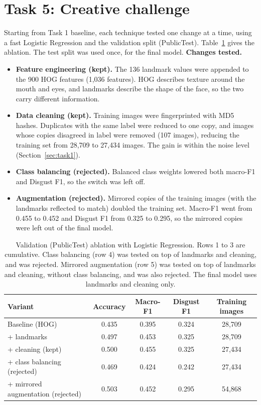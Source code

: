 \section{Task 5: Creative challenge}
\label{sec:creative}

Starting from Task 1 baseline, each technique tested one change at a time, using a fast Logistic Regression and the validation split (PublicTest). Table~\ref{tab:creative} gives the ablation. The test split was used once, for the final model.
\textbf{Changes tested.}
\begin{itemize}
\item \textbf{Feature engineering (kept).} The 136 landmark values were appended to the 900 HOG features (1,036 features). HOG describes texture around the mouth and eyes, and landmarks describe the shape of the face, so the two carry different information.
\item \textbf{Data cleaning (kept).} Training images were fingerprinted with MD5 hashes. Duplicates with the same label were reduced to one copy, and images whose copies disagreed in label were removed (107 images), reducing the training set from 28,709 to 27,434 images. The gain is within the noise level (Section~\ref{sec:task1}).
\item \textbf{Class balancing (rejected).} Balanced class weights lowered both macro-F1 and Disgust F1, so the switch was left off.
\item \textbf{Augmentation (rejected).} Mirrored copies of the training images (with the landmarks reflected to match) doubled the training set. Macro-F1 went from 0.455 to 0.452 and Disgust F1 from 0.325 to 0.295, so the mirrored copies were left out of the final model.
\end{itemize}

\begin{table}[h]
\centering\small
\caption{Validation (PublicTest) ablation with Logistic Regression. Rows 1 to 3 are cumulative. Class balancing (row 4) was tested on top of landmarks and cleaning, and was rejected. Mirrored augmentation (row 5) was tested on top of landmarks and cleaning, without class balancing, and was also rejected. The final model uses landmarks and cleaning only.}
\label{tab:creative}
\begin{tabular}{@{}lcccc@{}}\toprule
Variant & Accuracy & Macro-F1 & Disgust F1 & Training images \\\midrule
Baseline (HOG) & 0.435 & 0.395 & 0.324 & 28,709 \\
+ landmarks & 0.497 & 0.453 & 0.325 & 28,709 \\
+ cleaning (kept) & 0.500 & 0.455 & 0.325 & 27,434 \\
+ class balancing (rejected) & 0.469 & 0.424 & 0.242 & 27,434 \\
+ mirrored augmentation (rejected) & 0.503 & 0.452 & 0.295 & 54,868 \\
\bottomrule\end{tabular}
\end{table}

